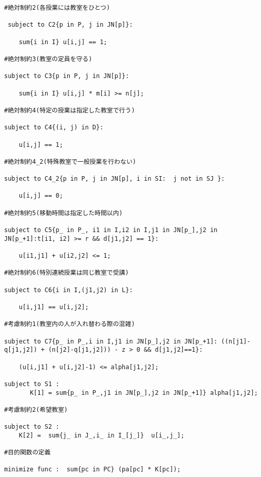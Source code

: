 \begin{lstlisting}[label=src1]
#絶対制約2(各授業には教室をひとつ)

 subject to C2{p in P, j in JN[p]}:

	sum{i in I} u[i,j] == 1;

#絶対制約3(教室の定員を守る)

subject to C3{p in P, j in JN[p]}:

	sum{i in I} u[i,j] * m[i] >= n[j];

#絶対制約4(特定の授業は指定した教室で行う)

subject to C4{(i, j) in D}:

	u[i,j] == 1;

#絶対制約4_2(特殊教室で一般授業を行わない)

subject to C4_2{p in P, j in JN[p], i in SI:  j not in SJ }:

	u[i,j] == 0;

#絶対制約5(移動時間は指定した時間以内)

subject to C5{p_ in P_, i1 in I,i2 in I,j1 in JN[p_],j2 in JN[p_+1]:t[i1, i2] >= r && d[j1,j2] == 1}:

	u[i1,j1] + u[i2,j2] <= 1;

#絶対制約6(特別連続授業は同じ教室で受講)

subject to C6{i in I,(j1,j2) in L}:

	u[i,j1] == u[i,j2];

#考慮制約1(教室内の人が入れ替わる際の混雑)

subject to C7{p_ in P_,i in I,j1 in JN[p_],j2 in JN[p_+1]: ((n[j1]-q[j1,j2]) + (n[j2]-q[j1,j2])) - z > 0 && d[j1,j2]==1}:

	(u[i,j1] + u[i,j2]-1) <= alpha[j1,j2];

subject to S1 : 
       K[1] = sum{p_ in P_,j1 in JN[p_],j2 in JN[p_+1]} alpha[j1,j2];

#考慮制約2(希望教室)

subject to S2 :
	K[2] =  sum{j_ in J_,i_ in I_[j_]}  u[i_,j_];

#目的関数の定義

minimize func :  sum{pc in PC} (pa[pc] * K[pc]);
\end{lstlisting}

\newpage
